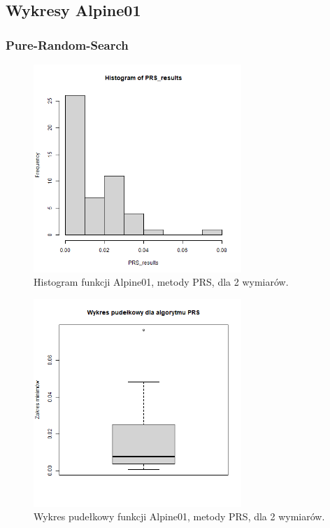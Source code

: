 \documentclass{lab}
\begin{document}
\subsection{Wykresy Alpine01}
\subsubsection{Pure-Random-Search}
\begin{figure}[H]
  \centering
  \includegraphics[width=0.7\textwidth]{img/dim2_PRS_Alpine01_his.png}
  \caption{Histogram funkcji Alpine01, metody PRS, dla 2 wymiarów.}
\end{figure}
\begin{figure}[H]
  \centering
  \includegraphics[width=0.7\textwidth]{img/dim2_PRS_Alpine01.png}
  \caption{Wykres pudełkowy funkcji Alpine01, metody PRS, dla 2 wymiarów.}
\end{figure}
\end{document}
